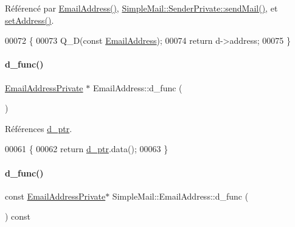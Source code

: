 Référencé par \hyperlink{class_simple_mail_1_1_email_address_a8bfbbe6dbdc1f420a7e6c7e52468bd54}{Email\+Address()}, \hyperlink{class_simple_mail_1_1_sender_private_a2ede5284746e77ee37b8fe96f4bbb100}{Simple\+Mail\+::\+Sender\+Private\+::send\+Mail()}, et \hyperlink{class_simple_mail_1_1_email_address_aab4a5642e2779dce05aafd267d5729ae}{set\+Address()}.


\begin{DoxyCode}
00072 \{
00073     Q\_D(\textcolor{keyword}{const} \hyperlink{class_simple_mail_1_1_email_address}{EmailAddress});
00074     \textcolor{keywordflow}{return} d->address;
00075 \}
\end{DoxyCode}
\mbox{\label{class_simple_mail_1_1_email_address_aa1ad0e3e3ff067e2c41ed350edc23a03}} 
\paragraph{\texorpdfstring{d\+\_\+func()}{d\_func()}\hspace{0.1cm}{\footnotesize\ttfamily [1/2]}}
{\footnotesize\ttfamily \hyperlink{class_simple_mail_1_1_email_address_private}{Email\+Address\+Private} $\ast$ Email\+Address\+::d\+\_\+func (\begin{DoxyParamCaption}{ }\end{DoxyParamCaption})\hspace{0.3cm}{\ttfamily [private]}}



Références \hyperlink{class_simple_mail_1_1_email_address_a27188c75c77a942e79cac0420788f214}{d\+\_\+ptr}.


\begin{DoxyCode}
00061 \{
00062     \textcolor{keywordflow}{return} \hyperlink{class_simple_mail_1_1_email_address_a27188c75c77a942e79cac0420788f214}{d\_ptr}.data();
00063 \}
\end{DoxyCode}
\mbox{\label{class_simple_mail_1_1_email_address_a70c5d2b0aabacfdfa692710f43cf0b5e}} 
\paragraph{\texorpdfstring{d\+\_\+func()}{d\_func()}\hspace{0.1cm}{\footnotesize\ttfamily [2/2]}}
{\footnotesize\ttfamily const \hyperlink{class_simple_mail_1_1_email_address_private}{Email\+Address\+Private}$\ast$ Simple\+Mail\+::\+Email\+Address\+::d\+\_\+func (\begin{DoxyParamCaption}{ }\end{DoxyParamCaption}) const\hspace{0.3cm}{\ttfamily [private]}}


